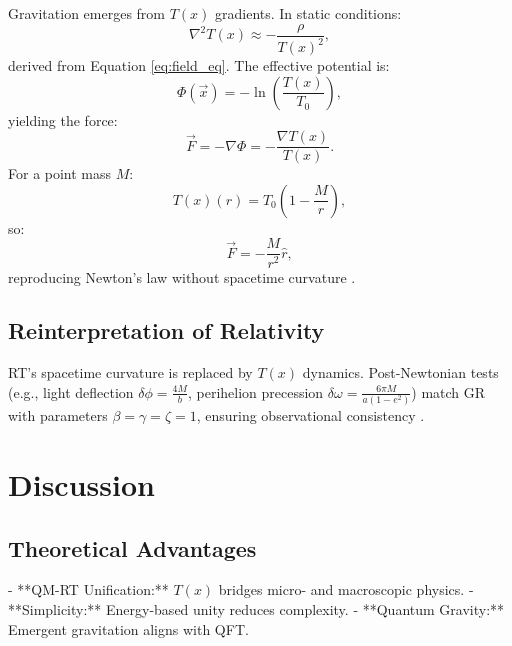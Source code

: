 \documentclass[twocolumn,aps,prl]{revtex4-2}
\newcommand{\Tfield}{T(x)}
\newcommand{\Tzero}{T_0}
\newcommand{\vecx}{\vec{x}}
\begin{document}
	Gravitation emerges from \(\Tfield\) gradients. In static conditions:
	\begin{equation}
		\nabla^2\Tfield \approx -\frac{\rho}{\Tfield^2},
		\label{eq:static_field}
	\end{equation}
	derived from Equation \ref{eq:field_eq}. The effective potential is:
	\begin{equation}
		\Phi(\vecx) = -\ln\left(\frac{\Tfield}{\Tzero}\right),
		\label{eq:grav_potential_def}
	\end{equation}
	yielding the force:
	\begin{equation}
		\vec{F} = -\nabla\Phi = -\frac{\nabla\Tfield}{\Tfield}.
		\label{eq:force_from_potential}
	\end{equation}
	For a point mass \(M\):
	\begin{equation}
		\Tfield(r) = \Tzero\left(1 - \frac{M}{r}\right),
		\label{eq:time_field_point_mass}
	\end{equation}
	so:
	\begin{equation}
		\vec{F} = -\frac{M}{r^2} \hat{r},
		\label{eq:newton_law}
	\end{equation}
	reproducing Newton’s law without spacetime curvature \cite{pascher_emergente_2025}.
	
	\subsection{Reinterpretation of Relativity}
	\label{subsec:rt_reinterpretation}
	
	RT’s spacetime curvature is replaced by \(\Tfield\) dynamics. Post-Newtonian tests (e.g., light deflection \(\delta\phi = \frac{4M}{b}\), perihelion precession \(\delta\omega = \frac{6\pi M}{a(1-e^2)}\)) match GR with parameters \(\beta = \gamma = \zeta = 1\), ensuring observational consistency \cite{Will2014}.
	
	\section{Discussion}
	\label{sec:discussion}
	
	\subsection{Theoretical Advantages}
	- **QM-RT Unification:** \(\Tfield\) bridges micro- and macroscopic physics.
	- **Simplicity:** Energy-based unity reduces complexity.
	- **Quantum Gravity:** Emergent gravitation aligns with QFT.
	
\end{document}
